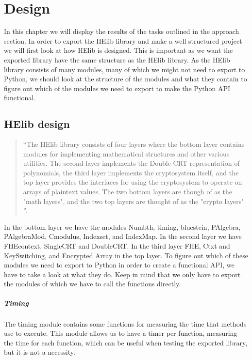 

\afterpage{\blankpage}   %

\chapter{Design}
In this chapter we will display the results of the tasks outlined in the approach section. In order to export the HElib library and make a well structured project we will first look at how HElib is designed. This is important as we want the exported library have the same structure as the HElib library. As the HElib library consists of many modules, many of which we might not need to export to Python, we should look at the structure of the modules and what they contain to figure out which of the modules we need to export to make the Python API functional.

\section{HElib design}
\begin{quotation} ``The HElib library consists of four layers where the bottom layer contains modules for implementing mathematical structures and other various utilities. The second layer implements the Double-CRT representation of polynomials, the third layer implements the cryptosystem itself, and the top layer provides the interfaces for using the cryptosystem to operate on arrays of plaintext values\cite{halevi2013design}. The two bottom layers are though of as the "math layers", and the two top layers are thought of as the "crypto layers" ''.\end{quotation}

In the bottom layer we have the modules Numbth, timing, bluestein, PAlgebra, PAlgebraMod, Cmodulus, Indexset, and IndexMap. In the second layer we have FHEcontext, SingleCRT and DoubleCRT. In the third layer FHE, Ctxt and KeySwitching, and Encrypted Array in the top layer. To figure out which of these modules we need to export to Python in order to create a functional API, we have to take a look at what they do. Keep in mind that we only have to export the modules of which we have to call the functions directly.

\newpage
\paragraph{Timing}
The timing module contains some functions for measuring the time that methods use to execute. This module allows us to have a timer per function, measuring the time for each function, which can be useful when testing the exported library, but it is not a necessity.

